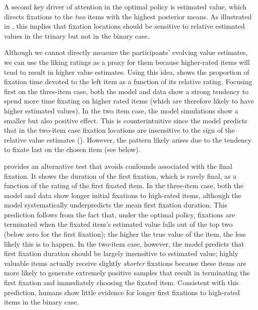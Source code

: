  
A second key driver of attention in the optimal policy is estimated value, which directs fixations to the \emph{two} items with the highest posterior means. As illustrated in , this implies that fixation locations should be sensitive to relative estimated values in the trinary but not in the binary case.

Although we cannot directly measure the participants' evolving value estimates, we can use the liking ratings as a proxy for them because higher-rated items will tend to result in higher value estimates. Using this idea,  shows the proportion of fixation time devoted to the left item as a function of its relative rating. Focusing first on the three-item case, both the model and data show a strong tendency to spend more time fixating on higher rated items (which are therefore likely to have higher estimated values). In the two item case, the model simulations show a smaller but also positive effect. This is counterintuitive since the model predicts that in the two-item case fixation locations are insensitive to the sign of the relative value estimates (). However, the pattern likely arises due to the tendency to fixate last on the chosen item (see  below).

 provides an alternative test that avoids confounds associated with the final fixation. It shows the duration of the first fixation, which is rarely final, as a function of the rating of the first fixated item. In the three-item case, both the model and data show longer initial fixations to high-rated items, although the model systematically underpredicts the mean first fixation duration. This prediction follows from the fact that, under the optimal policy, fixations are terminated when the fixated item's estimated value falls out of the top two (below zero for the first fixation); the higher the true value of the item, the less likely this is to happen. In the two-item case, however, the model predicts that first fixation duration should be largely insensitive to estimated value; highly valuable items actually receive slightly \emph{shorter} fixations because these items are more likely to generate extremely positive samples that result in terminating the first fixation and immediately choosing the fixated item. Consistent with this prediction, humans show little evidence for longer first fixations to high-rated items in the binary case.

